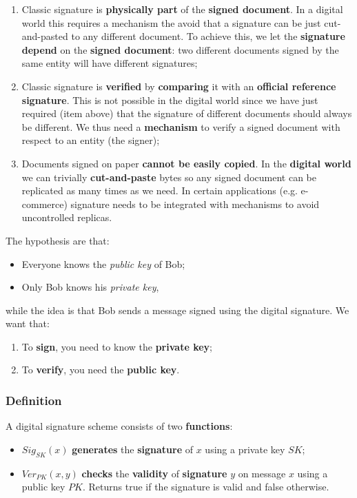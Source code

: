 \begin{enumerate}
    \item Classic signature is \textbf{physically part} of the \textbf{signed document}. In a digital world this requires a mechanism the avoid that a signature can be just cut-and-pasted to any different document. To achieve this, we let the \textbf{signature} \textbf{depend} on the \textbf{signed document}: two different documents signed by the same entity will have different signatures;
    \item Classic signature is \textbf{verified} by \textbf{comparing} it with an \textbf{official reference signature}. This is not possible in the digital world since we have just required (item above) that the signature of different documents should always be different. We thus need a \textbf{mechanism} to verify a signed document with respect to an entity (the signer);
    \item Documents signed on paper \textbf{cannot be easily copied}. In the \textbf{digital world} we can trivially \textbf{cut-and-paste} bytes so any signed document can be replicated as many times as we need. In certain applications (e.g. e-commerce) signature needs to be integrated with mechanisms to avoid uncontrolled replicas.
\end{enumerate}

The hypothesis are that:

\begin{itemize}
    \item Everyone knows the \textit{public key} of Bob;
    \item Only Bob knows his \textit{private key},
\end{itemize}

while the idea is that Bob sends a message signed using the digital signature. We want that:

\begin{enumerate}
    \item To \textbf{sign}, you need to know the \textbf{private key};
    \item To \textbf{verify}, you need the \textbf{public key}.
\end{enumerate}

\subsubsection{Definition}
A digital signature scheme consists of two \textbf{functions}:

\begin{itemize}
    \item $\mathit{Sig}_{SK}(x)$ \textbf{generates} the \textbf{signature} of $x$ using a private key $SK$;
    \item $\mathit{Ver}_{PK}(x,y)$ \textbf{checks} the \textbf{validity} of \textbf{signature} $y$ on message $x$ using a public key $PK$. Returns true if the signature is valid and false otherwise.
\end{itemize}

